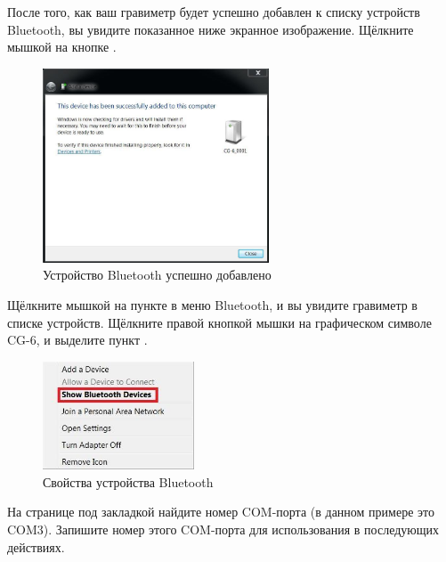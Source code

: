 После того, как ваш гравиметр \cg{} будет успешно добавлен к списку устройств
Bluetooth, вы увидите показанное ниже экранное изображение.  Щёлкните мышкой на
кнопке .

\begin{figure}[H]
  \centering
  \includegraphics[width=0.6\textwidth]{figures/bluetooth_device_successfully_added}
  \caption{Устройство Bluetooth успешно добавлено}
  \label{fig:bluetooth_device_successfully_added}
\end{figure}

Щёлкните мышкой на пункте  в меню Bluetooth, и вы
увидите гравиметр \cg{} в списке устройств. Щёлкните правой кнопкой мышки на
графическом символе CG-6, и выделите пункт .

\begin{figure}[H]
  \centering
  \includegraphics[width=0.4\textwidth]{figures/bluetooth_device_properties}
  \caption{Свойства устройства Bluetooth}
  \label{fig:bluetooth_device_properties}
\end{figure}


На странице под закладкой  найдите номер COM-порта (в данном примере
это COM3). Запишите номер этого COM-порта для использования в последующих
действиях.

